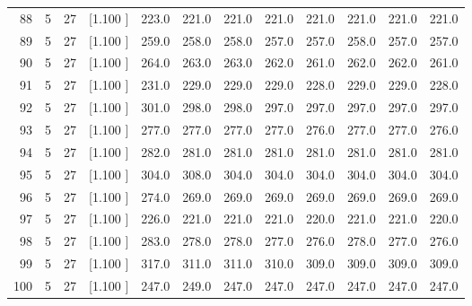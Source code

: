 \documentclass[12pt,a4paper]{article}
\begin{document}
\begin{center}
{\begin{tabular}{r r r r r r r r r r r r}
  88&  5& 27&[1.100     ]&   223.0&   221.0&   221.0&   221.0&   221.0&   221.0&   221.0&   221.0\\[-0.02in]
  89&  5& 27&[1.100     ]&   259.0&   258.0&   258.0&   257.0&   257.0&   258.0&   257.0&   257.0\\[-0.02in]
  90&  5& 27&[1.100     ]&   264.0&   263.0&   263.0&   262.0&   261.0&   262.0&   262.0&   261.0\\[-0.02in]
  91&  5& 27&[1.100     ]&   231.0&   229.0&   229.0&   229.0&   228.0&   229.0&   229.0&   228.0\\[-0.02in]
  92&  5& 27&[1.100     ]&   301.0&   298.0&   298.0&   297.0&   297.0&   297.0&   297.0&   297.0\\[-0.02in]
  93&  5& 27&[1.100     ]&   277.0&   277.0&   277.0&   277.0&   276.0&   277.0&   277.0&   276.0\\[-0.02in]
  94&  5& 27&[1.100     ]&   282.0&   281.0&   281.0&   281.0&   281.0&   281.0&   281.0&   281.0\\[-0.02in]
  95&  5& 27&[1.100     ]&   304.0&   308.0&   304.0&   304.0&   304.0&   304.0&   304.0&   304.0\\[-0.02in]
  96&  5& 27&[1.100     ]&   274.0&   269.0&   269.0&   269.0&   269.0&   269.0&   269.0&   269.0\\[-0.02in]
  97&  5& 27&[1.100     ]&   226.0&   221.0&   221.0&   221.0&   220.0&   221.0&   221.0&   220.0\\[-0.02in]
  98&  5& 27&[1.100     ]&   283.0&   278.0&   278.0&   277.0&   276.0&   278.0&   277.0&   276.0\\[-0.02in]
  99&  5& 27&[1.100     ]&   317.0&   311.0&   311.0&   310.0&   309.0&   309.0&   309.0&   309.0\\[-0.02in]
 100&  5& 27&[1.100     ]&   247.0&   249.0&   247.0&   247.0&   247.0&   247.0&   247.0&   247.0\\[-0.02in]

\hline
\end{tabular}}
\end{center}
\end{document}

